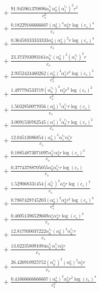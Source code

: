 \documentclass[10pt]{article}
\begin{document}
\begin{align*}
&{}  + \frac{91.945961370896 \alpha_{0}^{c_s} \alpha_{0}^s \left(\alpha_{1}^{c_s}\right)^{2} r^{2}}{c_{s}^{2}} \\
&{}  + \frac{0.18229166666667 \left(\alpha_{0}^s\right)^{4} \alpha_{2}^s r \log{\left(c_{s} \right)}^{4}}{c_{s}} \\
&{}  + \frac{0.36458333333333 \alpha_{0}^s \left(\alpha_{2}^s\right)^{2} r \log{\left(c_{s} \right)}^{4}}{c_{s}} \\
&{}  + \frac{23.373703093161 \alpha_{0}^{c_s} \left(\alpha_{0}^s\right)^{2} \left(\alpha_{1}^{c_s}\right)^{2} r}{c_{s}} \\
&{}  + \frac{2.9352424460262 \left(\alpha_{0}^s\right)^{4} \alpha_{1}^s r^{2} \log{\left(c_{s} \right)}^{3}}{c_{s}^{2}} \\
&{}  + \frac{1.497794533719 \left(\alpha_{0}^{c_s}\right)^{2} \alpha_{2}^s r^{3} \log{\left(c_{s} \right)}^{2}}{c_{s}^{3}} \\
&{}  + \frac{1.5032850077056 \left(\alpha_{0}^s\right)^{5} \alpha_{1}^{c_s} r \log{\left(c_{s} \right)}}{c_{s}} \\
&{}  + \frac{3.0091530762545 \left(\alpha_{1}^s\right)^{2} \alpha_{2}^{c_s} r \log{\left(c_{s} \right)}^{2}}{c_{s}} \\
&{}  + \frac{12.04513086854 \left(\alpha_{0}^s\right)^{3} \alpha_{1}^{c_s} \alpha_{1}^s r}{c_{s}} \\
&{}  + \frac{0.18854873071097 \alpha_{2}^{c_s} \alpha_{3}^s r \log{\left(c_{s} \right)}^{3}}{c_{s}} \\
&{}  + \frac{0.37743788705055 \alpha_{0}^s \alpha_{5}^{c_s} r \log{\left(c_{s} \right)}}{c_{s}} \\
&{}  + \frac{1.529068331454 \left(\alpha_{0}^{c_s}\right)^{2} \alpha_{4}^s r \log{\left(c_{s} \right)}^{2}}{c_{s}} \\
&{}  + \frac{0.7867428745203 \left(\alpha_{0}^s\right)^{2} \alpha_{3}^s r^{2} \log{\left(c_{s} \right)}^{3}}{c_{s}^{2}} \\
&{}  + \frac{0.40051396529669 \alpha_{1}^s \alpha_{4}^s r \log{\left(c_{s} \right)}^{3}}{c_{s}} \\
&{}  + \frac{12.817930037222 \alpha_{0}^{c_s} \left(\alpha_{0}^s\right)^{3} \alpha_{2}^{c_s} r}{c_{s}} \\
&{}  + \frac{13.022358091094 \alpha_{0}^{c_s} \alpha_{1}^{c_s} \alpha_{3}^s r}{c_{s}} \\
&{}  + \frac{26.426910925752 \left(\alpha_{0}^{c_s}\right)^{2} \left(\alpha_{0}^s\right)^{2} \alpha_{2}^s r}{c_{s}} \\
&{}  + \frac{0.41666666666667 \left(\alpha_{0}^s\right)^{3} \alpha_{2}^s r^{2} \log{\left(c_{s} \right)}^{4}}{c_{s}^{2}} \\

\end{align*}
\end{document}
